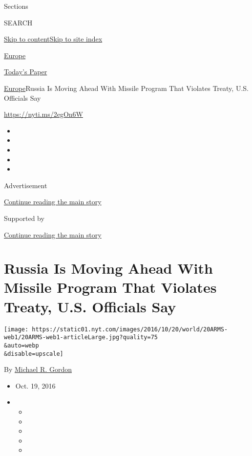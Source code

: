 Sections

SEARCH

\protect\hyperlink{site-content}{Skip to
content}\protect\hyperlink{site-index}{Skip to site index}

\href{https://www.nytimes.com/section/world/europe}{Europe}

\href{https://myaccount.nytimes.com/auth/login?response_type=cookie\&client_id=vi}{}

\href{https://www.nytimes.com/section/todayspaper}{Today's Paper}

\href{/section/world/europe}{Europe}\textbar{}Russia Is Moving Ahead
With Missile Program That Violates Treaty, U.S. Officials Say

\url{https://nyti.ms/2egOn6W}

\begin{itemize}
\item
\item
\item
\item
\item
\end{itemize}

Advertisement

\protect\hyperlink{after-top}{Continue reading the main story}

Supported by

\protect\hyperlink{after-sponsor}{Continue reading the main story}

\hypertarget{russia-is-moving-ahead-with-missile-program-that-violates-treaty-us-officials-say}{%
\section{Russia Is Moving Ahead With Missile Program That Violates
Treaty, U.S. Officials
Say}\label{russia-is-moving-ahead-with-missile-program-that-violates-treaty-us-officials-say}}

\texttt{[image: https://static01.nyt.com/images/2016/10/20/world/20ARMS-web1/20ARMS-web1-articleLarge.jpg?quality=75\\\&auto=webp\\\&disable=upscale]}

By \href{http://www.nytimes.com/by/michael-r-gordon}{Michael R. Gordon}

\begin{itemize}
\item
  Oct. 19, 2016
\item
  \begin{itemize}
  \item
  \item
  \item
  \item
  \item
  \end{itemize}
\end{itemize}

